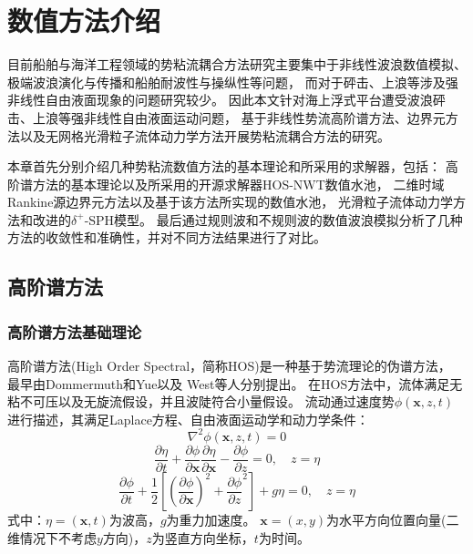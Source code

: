 \section{
  \texorpdfstring{数值方法介绍} %
  {\thesection 数值方法介绍} %
}
\label{sec:数值方法介绍}

目前船舶与海洋工程领域的势粘流耦合方法研究主要集中于非线性波浪数值模拟、极端波浪演化与传播和船舶耐波性与操纵性等问题，%
而对于砰击、上浪等涉及强非线性自由液面现象的问题研究较少。%
因此本文针对海上浮式平台遭受波浪砰击、上浪等强非线性自由液面运动问题，%
基于非线性势流高阶谱方法、边界元方法以及无网格光滑粒子流体动力学方法开展势粘流耦合方法的研究。%

本章首先分别介绍几种势粘流数值方法的基本理论和所采用的求解器，包括：%
高阶谱方法的基本理论以及所采用的开源求解器HOS-NWT数值水池，%
二维时域Rankine源边界元方法以及基于该方法所实现的数值水池，%
光滑粒子流体动力学方法和改进的$\delta^+$-SPH模型。%
最后通过规则波和不规则波的数值波浪模拟分析了几种方法的收敛性和准确性，并对不同方法结果进行了对比。

\subsection{
  \texorpdfstring{高阶谱方法} %
  {\thesubsection 高阶谱方法} %
}
\label{ssec:高阶谱方法}

\subsubsection{
  \texorpdfstring{高阶谱方法基础理论} %
  {\thesubsubsection 高阶谱方法基础理论} %
}
\label{sssec:高阶谱方法基础理论}

高阶谱方法(High Order Spectral，简称HOS)是一种基于势流理论的伪谱方法，%
最早由Dommermuth和Yue\cite{dommermuthHighorderSpectralMethod1987a}以及%
West等人\cite{westNewNumericalMethod1987a}分别提出。%
在HOS方法中，流体满足无粘不可压以及无旋流假设，并且波陡符合小量假设。%
流动通过速度势$\phi\left(\bm{x},z,t\right)$进行描述，其满足Laplace方程、自由液面运动学和动力学条件：
\begin{equation}
  \nabla^2\phi\left(\bm{x},z,t\right) = 0
  \label{eq:HOS-Laplace}
\end{equation}
\begin{equation}
  \frac{\partial \eta}{\partial t} + \frac{\partial \phi}{\partial \bm{x}}\frac{\partial \eta}{\partial \bm{x}} %
  - \frac{\partial \phi}{\partial z} = 0,\quad z = \eta
  \label{eq:HOS-KFBC}
\end{equation}
\begin{equation}
  \frac{\partial \phi}{\partial t} %
  + \frac{1}2 \left[\left(\frac{\partial \phi}{\partial \bm{x}}\right)^2 %
  + \frac{\partial \phi}{\partial z}^2\right] + g\eta = 0,\quad z = \eta
  \label{eq:HOS-DFBC}
\end{equation}
式中：$\eta = \left(\bm{x},t\right)$为波高，$g$为重力加速度。%
$\bm{x} = \left(x,y\right)$为水平方向位置向量(二维情况下不考虑$y$方向)，$z$为竖直方向坐标，$t$为时间。

